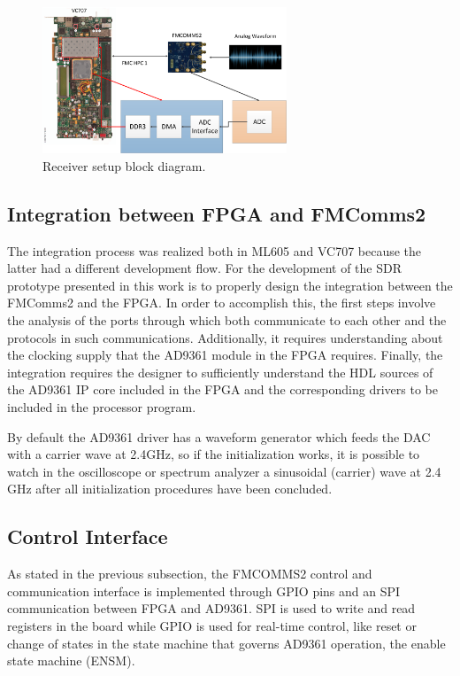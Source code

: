 \begin{figure}[htbp]
    \centering
    \includegraphics[width=0.65\textwidth]{./figures/rx_setup}
    \caption{ Receiver setup block diagram.
    \label{fig:rxsetup}}
\end{figure}



\subsection{Integration between FPGA and FMComms2}

The integration process was realized both in ML605 and VC707 because the latter
had a different development flow. For the development of the SDR prototype
presented in this work is to properly design the integration between the
FMComms2 and the FPGA. In order to accomplish this, the first steps involve the
analysis of the ports through which both communicate to each other and the
protocols in such communications. Additionally, it requires understanding about
the clocking supply that the AD9361 module in the FPGA requires. Finally, the
integration requires the designer to sufficiently understand the HDL sources of
the AD9361 IP core included in the FPGA and the corresponding drivers to be
included in the processor program.

By default the AD9361 driver has a waveform generator which feeds the DAC with a
carrier wave at 2.4GHz, so if the initialization works, it is possible to watch
in the oscilloscope or spectrum analyzer a sinusoidal (carrier) wave at 2.4 GHz
after all initialization procedures have been concluded.

\subsection{Control Interface}
\label{subs:controlif}

As stated in the previous subsection, the FMCOMMS2 control and communication
interface is implemented through GPIO pins and an SPI communication between FPGA
and AD9361. SPI is used to write and read registers in the board while GPIO is
used for real-time control, like reset or change of states in the state machine
that governs AD9361 operation, the enable state machine (ENSM).

